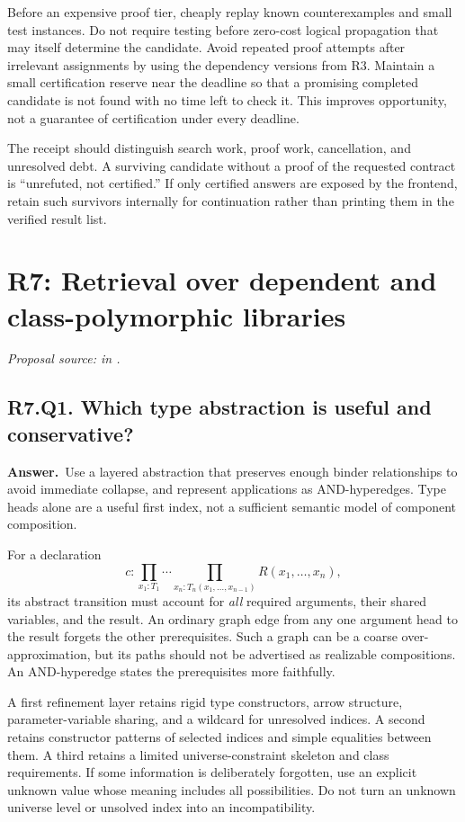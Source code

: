 \documentclass[11pt,a4paper]{article}
\theoremstyle{definition}
\theoremstyle{remark}
\newcommand{\answer}{\par\noindent\textbf{Answer.}\ }
\newcommand{\sourcepart}[1]{\par\noindent\textit{Proposal source: #1 in \cite{proposal}.}}
\newcommand{\qheading}[2]{\subsection{#1. #2}}
\begin{document}
Before an expensive proof tier, cheaply replay known counterexamples and small
test instances. Do not require testing before zero-cost logical propagation
that may itself determine the candidate. Avoid repeated proof attempts after
irrelevant assignments by using the dependency versions from R3. Maintain a
small certification reserve near the deadline so that a promising completed
candidate is not found with no time left to check it. This improves opportunity,
not a guarantee of certification under every deadline.

The receipt should distinguish search work, proof work, cancellation, and
unresolved debt. A surviving candidate without a proof of the requested
contract is ``unrefuted, not certified.'' If only certified answers are exposed
by the frontend, retain such survivors internally for continuation rather than
printing them in the verified result list.

\section{R7: Retrieval over dependent and class-polymorphic libraries}
\label{sec:r7}
\sourcepart{}

\qheading{R7.Q1}{Which type abstraction is useful and conservative?}
\answer Use a layered abstraction that preserves enough binder relationships
to avoid immediate collapse, and represent applications as AND-hyperedges.
Type heads alone are a useful first index, not a sufficient semantic model of
component composition.

For a declaration
\[
 c:\prod_{x_1:T_1}\cdots\prod_{x_n:T_n(x_1,\ldots,x_{n-1})}
       R(x_1,\ldots,x_n),
\]
its abstract transition must account for \emph{all} required arguments, their
shared variables, and the result. An ordinary graph edge from any one argument
head to the result forgets the other prerequisites. Such a graph can be a
coarse over-approximation, but its paths should not be advertised as realizable
compositions. An AND-hyperedge states the prerequisites more faithfully.

A first refinement layer retains rigid type constructors, arrow structure,
parameter-variable sharing, and a wildcard for unresolved indices. A second
retains constructor patterns of selected indices and simple equalities between
them. A third retains a limited universe-constraint skeleton and class
requirements. If some information is deliberately forgotten, use an explicit
unknown value whose meaning includes all possibilities. Do not turn an unknown
universe level or unsolved index into an incompatibility.
\end{document}
